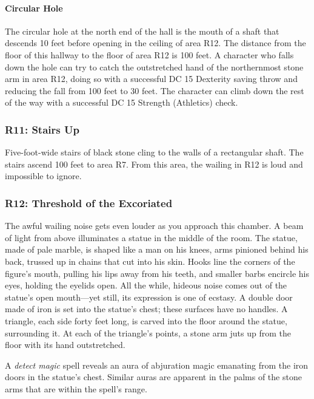 \documentclass[10pt,a4,twoside,twocolumn,openany,nodeprecatedcode]{dndbook}
\begin{document}
\paragraph{Circular Hole}
The circular hole at the north end of the hall is the mouth of a shaft that descends 10 feet before opening in the ceiling of area R12. The distance from the floor of this hallway to the floor of area R12 is 100 feet. A character who falls down the hole can try to catch the outstretched hand of the northernmost stone arm in area R12, doing so with a successful DC 15 Dexterity saving throw and reducing the fall from 100 feet to 30 feet. The character can climb down the rest of the way with a successful DC 15 Strength (Athletics) check.
\subsubsection{R11: Stairs Up}
Five-foot-wide stairs of black stone cling to the walls of a rectangular shaft. The stairs ascend 100 feet to area R7.
From this area, the wailing in R12 is loud and impossible to ignore.
\subsubsection{R12: Threshold of the Excoriated}
\begin{DndReadAloud}{}
The awful wailing noise gets even louder as you approach this chamber. A beam of light from above illuminates a statue in the middle of the room. The statue, made of pale marble, is shaped like a man on his knees, arms pinioned behind his back, trussed up in chains that cut into his skin. Hooks line the corners of the figure's mouth, pulling his lips away from his teeth, and smaller barbs encircle his eyes, holding the eyelids open. All the while, hideous noise comes out of the statue's open mouth—yet still, its expression is one of ecstasy. A double door made of iron is set into the statue's chest; these surfaces have no handles.
A triangle, each side forty feet long, is carved into the floor around the statue, surrounding it. At each of the triangle's points, a stone arm juts up from the floor with its hand outstretched.
\end{DndReadAloud}

A \textit{detect magic} spell reveals an aura of abjuration magic emanating from the iron doors in the statue's chest. Similar auras are apparent in the palms of the stone arms that are within the spell's range.
\end{document}
